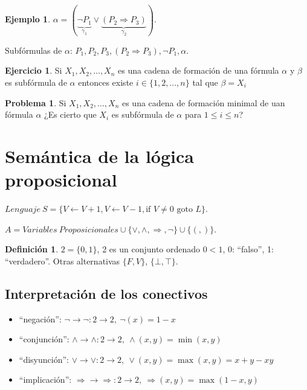 \documentclass[a4paper,11pt]{article}
\theoremstyle{definition}
\newtheorem{defn}{Definición}[section]
\newtheorem{exap}{Ejemplo}[section]
\newtheorem*{prob}{Problema}
\newtheorem*{ejer}{Ejercicio}
\theoremstyle{remark}
\begin{document}
\begin{exap}
$\alpha = (\underbrace{\neg P_1}_{\gamma_1} \vee \underbrace{(P_2 \Rightarrow P_3)}_{\gamma_2})$.

Subfórmulas de $\alpha$: $P_1, P_2, P_3, (P_2 \Rightarrow P_3), \neg P_1, \alpha$.
\end{exap}

\begin{ejer}
Si $X_1, X_2, \dots, X_n$ es una cadena de formación de una fórmula $\alpha$ y 
$\beta$ es subfórmula de $\alpha$ entonces existe $i \in \{1,2,\dots,n\}$
tal que $\beta = X_i$
\end{ejer}

\begin{prob}
Si $X_1, X_2, \dots, X_n$ es una cadena de formación minimal de uan fórmula $\alpha$
¿Es cierto que $X_i$ es subfórmula de $\alpha$ para $1 \le i \le n$?
\end{prob}

\section*{Semántica de la lógica proposicional}

$Lenguaje\ S = \{V \leftarrow V + 1, V \leftarrow V - 1, \text{if } V \neq 0 \text{ goto }L\}$.

$A = Variables\ Proposicionales \cup \{\vee, \wedge, \Rightarrow, \neg\} \cup \{(,)\}$.

\begin{defn}
$2 = \{0, 1\}$, 2 es un conjunto ordenado $0 < 1$, 0: ``falso'', 1: ``verdadero''. Otras
alternativas $\{F, V\}$, $\{\bot, \top\}$.
\end{defn}

\subsection*{Interpretación de los conectivos}

\begin{itemize}
\item ``negación'': $\neg \longrightarrow \neg : 2 \to 2,\ \neg(x) = 1 - x$
\item ``conjunción'': $\wedge \longrightarrow \wedge : 2 \to 2,\ \wedge(x, y) = \min(x,y)$
\item ``disyunción'': $\vee \longrightarrow \vee : 2 \to 2,\ \vee(x, y) = \max(x, y) = x + y - xy$
\item ``implicación'': $\Rightarrow \longrightarrow \Rightarrow : 2 \to 2,\ 
\Rightarrow(x, y) = \max(1 -x, y)$
\end{itemize}
\end{document}
